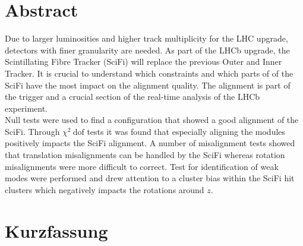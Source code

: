 \chapter*{Abstract}
\label{sec:abstract}

Due to larger luminosities and higher track multiplicity for the LHC upgrade, detectors with finer granularity are needed.
As part of the LHCb upgrade, the Scintillating Fibre Tracker (SciFi) will replace the previous Outer and Inner Tracker. It is crucial to understand which constraints and which parts of of the SciFi have the most impact on the alignment quality.
The alignment is part of the trigger and a crucial section of the real-time analysis of the LHCb experiment.
\\
Null tests were used to find a configuration that showed a good alignment of the SciFi.
Through $\chi^2 \ \text{dof}$ tests it was found that especially aligning the modules positively impacts the SciFi alignment.
A number of misalignment tests showed that translation misalignments can be handled by the SciFi whereas rotation misalignments were more difficult to correct.
Test for identification of weak modes were performed and drew attention to a cluster bias within the SciFi hit clusters which negatively impacts the rotations around $z$.

{\let\clearpage\relax \chapter*{Kurzfassung}}
\label{sec:kurzf}

